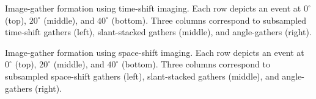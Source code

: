 
{Image-gather formation using time-shift imaging.
Each row depicts an event at 
$0 ^\circ$ (top),
$20^\circ$ (middle), and
$40^\circ$ (bottom).
Three columns correspond to
subsampled time-shift gathers (left),
slant-stacked gathers (middle), and
angle-gathers (right).}

{Image-gather formation using space-shift imaging.
Each row depicts an event at 
$0 ^\circ$ (top),
$20^\circ$ (middle), and
$40^\circ$ (bottom).
Three columns correspond to
subsampled space-shift gathers (left),
slant-stacked gathers (middle), and
angle-gathers (right).}
